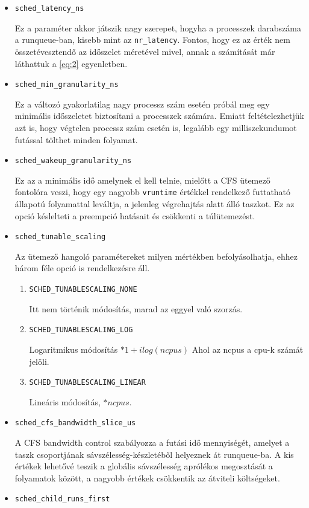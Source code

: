 \begin{itemize}
\item \texttt{sched\_latency\_ns}

Ez a paraméter akkor játszik nagy szerepet, hogyha a processzek darabszáma a runqueue-ban, kisebb mint az \texttt{nr\_latency}. Fontos, hogy ez az érték nem összetévesztendő az időszelet méretével mivel, annak a számítását már láthattuk a \ref{eq:2} egyenletben. 

\item \texttt{sched\_min\_granularity\_ns}

Ez a változó gyakorlatilag nagy processz szám esetén próbál meg egy minimális időszeletet biztosítani a processzek számára. Emiatt feltételezhetjük azt is, hogy végtelen processz szám esetén is, legalább egy milliszekundumot futással tölthet minden folyamat.

\item \texttt{sched\_wakeup\_granularity\_ns}

Ez az a minimális idő amelynek el kell telnie, mielőtt a CFS ütemező fontolóra veszi, hogy egy nagyobb \texttt{vruntime} értékkel rendelkező futtatható állapotú folyamattal leváltja, a jelenleg végrehajtás alatt álló taszkot.
Ez az opció késlelteti a preempció hatásait és csökkenti a túlütemezést. 

\item \texttt{sched\_tunable\_scaling}

Az ütemező hangoló paramétereket milyen mértékben befolyásolhatja, ehhez három féle opció is rendelkezésre áll.
\begin{enumerate}
\item \texttt{SCHED\_TUNABLESCALING\_NONE}

Itt nem történik módosítás, marad az eggyel való szorzás.
\item \texttt{SCHED\_TUNABLESCALING\_LOG}

Logaritmikus módosítás $*1+ilog(ncpus)$
Ahol az ncpus a cpu-k számát jelöli.

\item \texttt{SCHED\_TUNABLESCALING\_LINEAR}

Lineáris módosítás, $*ncpus$. 
\end{enumerate}

\item \texttt{sched\_cfs\_bandwidth\_slice\_us}

A CFS bandwidth control szabályozza a futási idő mennyiségét, amelyet a taszk csoportjának sávszélesség-készletéből helyeznek át runqueue-ba. A kis értékek lehetővé teszik a globális sávszélesség aprólékos megosztását a folyamatok között, a nagyobb értékek csökkentik az átviteli költségeket.
\item \texttt{sched\_child\_runs\_first}


\end{itemize}
